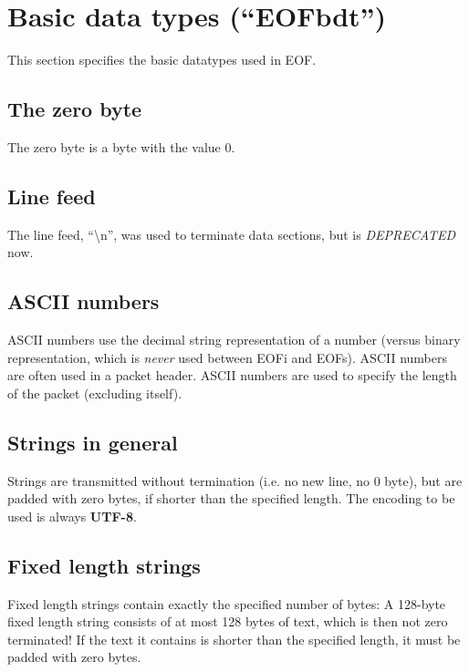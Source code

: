 \section{Basic data types ("`EOFbdt"')}
This section specifies the basic datatypes used in EOF.
\subsection{The zero byte}
The zero byte is a byte with the value 0.
\subsection{Line feed}
The line feed, "`\textbackslash{}n"', was used to terminate data
sections, but is \emph{DEPRECATED} now.
\subsection{ASCII numbers}
ASCII numbers use the decimal string representation of a number (versus
binary representation, which is \emph{never} used between EOFi and EOFs).
ASCII numbers are often used in a packet header.
ASCII numbers are used to specify the length of the packet (excluding itself).
\subsection{Strings in general}
Strings are transmitted without termination (i.e. no new line, no 0 byte),
but are padded with zero bytes, if shorter than the specified length.
The encoding to be used is always \textbf{UTF-8}\cite{utf8}.
\subsection{Fixed length strings}
Fixed length strings contain exactly the specified number of bytes:
A 128-byte fixed length string consists of at most 128 bytes of text,
which is then not zero terminated!
If the text it contains is shorter than the specified length,
it must be padded with zero bytes.
